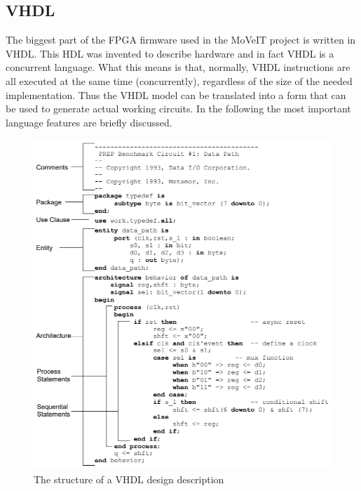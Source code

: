 \subsection{VHDL}
\noindent The biggest part of the FPGA firmware used in the MoVeIT project is written in VHDL\cite{vhdl}. This HDL was invented to describe hardware and in fact VHDL is a concurrent language. What this means is that, normally, VHDL instructions are all executed at the same time (concurrently), regardless of the size of the needed implementation. Thus the VHDL model can be translated into a form that can be used to generate actual working circuits. In the following the most important language features are briefly discussed. 
\begin{figure}[H]
	\centering
	\includegraphics[width=0.6\linewidth]{IMG/ch3/VHDL}
	\caption{The structure of a VHDL design description}
	\label{fig:vhdl}
\end{figure}

